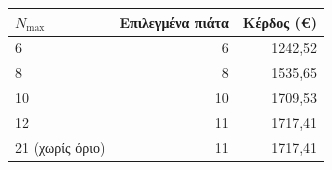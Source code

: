 \begin{tabular}{@{}lrr@{}}
\toprule
$N_{\max}$ & \textbf{Επιλεγμένα πιάτα} & \textbf{Κέρδος (€)} \\
\midrule
6 & 6 & 1242,52 \\
8 & 8 & 1535,65 \\
10 & 10 & 1709,53 \\
12 & 11 & 1717,41 \\
21 (χωρίς όριο) & 11 & 1717,41 \\
\bottomrule
\end{tabular}
